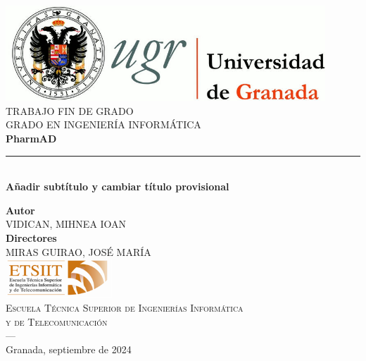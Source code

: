 \begin{titlepage}
 
 
\newlength{\centeroffset}
\setlength{\centeroffset}{-0.5\oddsidemargin}
\addtolength{\centeroffset}{0.5\evensidemargin}
\thispagestyle{empty}

\noindent\hspace*{\centeroffset}\begin{minipage}{\textwidth}

\centering
\includegraphics[width=0.9\textwidth]{imagenes/logo_ugr.jpg}\\[1.4cm]

\textsc{ \Large TRABAJO FIN DE GRADO\\[0.2cm]}
\textsc{ GRADO EN INGENIERÍA INFORMÁTICA}\\[1cm]
% 
{\Huge\bfseries PharmAD\\
}
\noindent\rule[-1ex]{\textwidth}{3pt}\\[3.5ex]
{\large\bfseries Añadir subtítulo y cambiar título provisional}
\end{minipage}

\vspace{2.5cm}
\noindent\hspace*{\centeroffset}\begin{minipage}{\textwidth}
\centering

\textbf{Autor}\\ {VIDICAN, MIHNEA IOAN}\\[2.5ex]
\textbf{Directores}\\
{MIRAS GUIRAO, JOSÉ MARÍA}\\[2cm]
\includegraphics[width=0.3\textwidth]{imagenes/etsiit_logo.png}\\[0.1cm]
\textsc{Escuela Técnica Superior de Ingenierías Informática \\ y de Telecomunicación}\\
\textsc{---}\\
Granada, septiembre de 2024
\end{minipage}
\end{titlepage}


